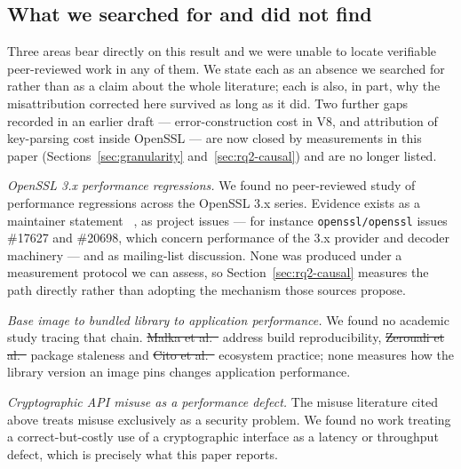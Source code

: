 \documentclass[pdflatex,sn-basic,twocolumn]{sn-jnl}%
\providecommand{\DIFdel}[1]{{\protect\color{red}\sout{#1}}}                      %
\providecommand{\DIFaddbegin}{} %
\providecommand{\DIFaddend}{} %
\providecommand{\DIFdelbegin}{} %
\providecommand{\DIFdelend}{} %
\newcommand{\DIFscaledelfig}{0.5}
\newlength{\DIFdelgraphicswidth} %
\newlength{\DIFdelgraphicsheight} %
\newcommand{\DIFaddincludegraphics}[2][]{{\color{blue}\fbox{\DIFOincludegraphics[#1]{#2}}}} %
\newcommand{\DIFdelincludegraphics}[2][]{%
\sbox{\DIFdelgraphicsbox}{\DIFOincludegraphics[#1]{#2}}%
\settoboxwidth{\DIFdelgraphicswidth}{\DIFdelgraphicsbox} %
\settoboxtotalheight{\DIFdelgraphicsheight}{\DIFdelgraphicsbox} %
\scalebox{\DIFscaledelfig}{%
\parbox[b]{\DIFdelgraphicswidth}{\usebox{\DIFdelgraphicsbox}\\[-\baselineskip] \rule{\DIFdelgraphicswidth}{0em}}\llap{\resizebox{\DIFdelgraphicswidth}{\DIFdelgraphicsheight}{%
\setlength{\unitlength}{\DIFdelgraphicswidth}%
\begin{picture}(1,1)%
\thicklines\linethickness{2pt} %
{\color[rgb]{1,0,0}\put(0,0){\framebox(1,1){}}}%
{\color[rgb]{1,0,0}\put(0,0){\line( 1,1){1}}}%
{\color[rgb]{1,0,0}\put(0,1){\line(1,-1){1}}}%
\end{picture}%
}\hspace*{3pt}}} %
} %
\DeclareRobustCommand{\DIFaddbegin}{\DIFOaddbegin \let\includegraphics\DIFaddincludegraphics} %
\DeclareRobustCommand{\DIFaddend}{\DIFOaddend \let\includegraphics\DIFOincludegraphics} %
\DeclareRobustCommand{\DIFdelbegin}{\DIFOdelbegin \let\includegraphics\DIFdelincludegraphics} %
\DeclareRobustCommand{\DIFdelend}{\DIFOaddend \let\includegraphics\DIFOincludegraphics} %
\begin{document}
\subsection{What we searched for and did not find}\label{sec:gaps}

Three areas bear directly on this result and we were unable to locate
verifiable peer-reviewed work in any of them. We state each as an absence we
searched for rather than as a claim about the whole literature; each is also,
in part, why the misattribution corrected here survived as long as it did. Two
further gaps recorded in an earlier draft --- error-construction cost in V8,
and attribution of key-parsing cost inside OpenSSL --- are now closed by
measurements in this paper (Sections~\ref{sec:granularity}
and~\ref{sec:rq2-causal}) and are no longer listed.

\emph{OpenSSL 3.x performance regressions.} We found no peer-reviewed study of
performance regressions across the OpenSSL 3.x series. Evidence exists as a
maintainer statement~\DIFdelbegin %
\DIFdelend \DIFaddbegin \citep{pyca2026stateofopenssl}\DIFaddend , as project issues --- for
instance \texttt{openssl/openssl} issues \#17627 and \#20698, which concern
performance of the 3.x provider and decoder machinery --- and as mailing-list
discussion. None was produced under a measurement protocol we can assess, so
Section~\ref{sec:rq2-causal} measures the path directly rather than adopting
the mechanism those sources propose.

\emph{Base image to bundled library to application performance.} We found no
academic study tracing that chain. \DIFdelbegin \DIFdel{Malka et al.~}%
\DIFdelend \DIFaddbegin \citet{malka2026docker} \DIFaddend address
build reproducibility, \DIFdelbegin \DIFdel{Zerouali et al.~}%
\DIFdelend \DIFaddbegin \citet{zerouali2019outdated} \DIFaddend package
staleness and \DIFdelbegin \DIFdel{Cito et al.~}%
\DIFdelend \DIFaddbegin \citet{cito2017empirical} \DIFaddend ecosystem practice; none
measures how the library version an image pins changes application
performance.

\emph{Cryptographic API misuse as a performance defect.} The misuse literature
cited above treats misuse exclusively as a security problem. We found no work
treating a correct-but-costly use of a cryptographic interface as a latency or
throughput defect, which is precisely what this paper reports.
\end{document}
